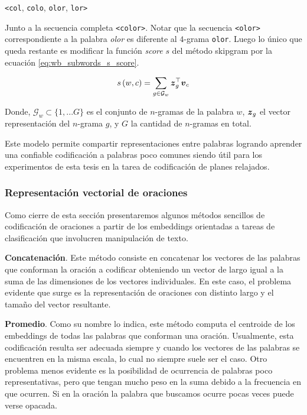 \begin{center}
    \verb|<col|, \verb|colo|, \verb|olor|, \verb|lor>|
\end{center}

Junto a la secuencia completa \verb|<color>|. Notar que la secuencia
\verb|<olor>| correspondiente a la palabra \emph{olor} es diferente al $4$-grama
\verb|olor|. Luego lo único que queda restante es modificar la función
\emph{score} $s$ del método skipgram por la ecuación
\ref{eq:wb_subwords_s_score}.

\begin{equation} \label{eq:wb_subwords_s_score}
    s\left(w, c\right) = \sum_{g \in \mathcal{G}_w} \boldsymbol{z}_g^{\top}\boldsymbol{v}_c
\end{equation}

Donde, $\mathcal{G}_w \subset \{1, ... G\}$ es el conjunto de $n$-gramas de la
palabra $w$, $\boldsymbol{z}_g$ el vector representación del $n$-grama $g$, y $G$ la
cantidad de $n$-gramas en total.

Este modelo permite compartir representaciones entre palabras logrando aprender
una confiable codificación a palabras poco comunes siendo útil para los
experimentos de esta tesis en la tarea de codificación de planes relajados.

\subsubsection{Representación vectorial de oraciones}
\label{lit:sentence_vector}

Como cierre de esta sección presentaremos algunos métodos sencillos de
codificación de oraciones a partir de los embeddings orientadas a tareas de
clasificación que involucren manipulación de texto.

\textbf{Concatenación}. Este método consiste en concatenar los vectores de las
palabras que conforman la oración a codificar obteniendo un vector de largo
igual a la suma de las dimensiones de los vectores individuales. En este caso,
el problema evidente que surge es la representación de oraciones con distinto
largo y el tamaño del vector resultante.

\textbf{Promedio}. Como su nombre lo indica, este método computa el centroide de
los embeddings de todas las palabras que conforman una oración. Usualmente, esta
codificación resulta ser adecuada siempre y cuando los vectores de las palabras
se encuentren en la misma escala, lo cual no siempre suele ser el caso. Otro
problema menos evidente es la posibilidad de ocurrencia de palabras poco
representativas, pero que tengan mucho peso en la suma debido a la frecuencia en
que ocurren. Si en la oración la palabra que buscamos ocurre pocas veces puede
verse opacada.

